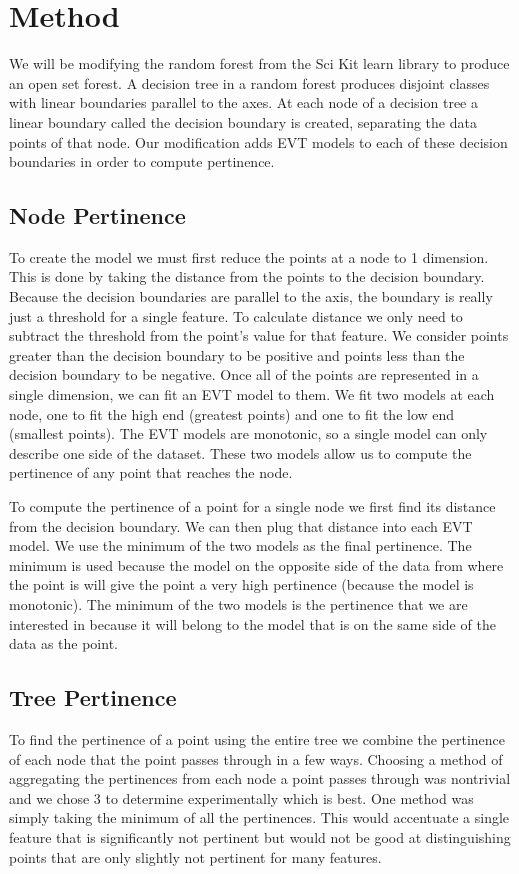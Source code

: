 \documentclass[conference]{IEEEtran}
\begin{document}
\section{Method}
	
We will be modifying the random forest from the Sci Kit learn library \cite{sklearn} to produce an open set forest.  A decision tree in a random forest produces disjoint classes with linear boundaries parallel to the axes.  At each node of a decision tree a linear boundary called the decision boundary is created, separating the data points of that node.  Our modification adds EVT models to each of these decision boundaries in order to compute pertinence.  
\subsection{Node Pertinence}
To create the model we must first reduce the points at a node to 1 dimension.  This is done by taking the distance from the points to the decision boundary.  Because the decision boundaries are parallel to the axis, the boundary is really just a threshold for a single feature.  To calculate distance we only need to subtract the threshold from the point's value for that feature.  We consider points greater than the decision boundary to be positive and points less than the decision boundary to be negative.  Once all of the points are represented in a single dimension, we can fit an EVT model to them.  We fit two models at each node, one to fit the high end (greatest points) and one to fit the low end (smallest points).  The EVT models are monotonic, so a single model can only describe one side of the dataset.  These two models allow us to compute the pertinence of any point that reaches the node.  

To compute the pertinence of a point for a single node we first find its distance from the decision boundary.  We can then plug that distance into each EVT model.  We use the minimum of the two models as the final pertinence.  The minimum is used because the model on the opposite side of the data from where the point is will give the point a very high pertinence (because the model is monotonic).  The minimum of the two models is the pertinence that we are interested in because it will belong to the model that is on the same side of the data as the point.
\subsection{Tree Pertinence}
To find the pertinence of a point using the entire tree we combine the pertinence of each node that the point passes through in a few ways.  Choosing a method of aggregating the pertinences from each node a point passes through was nontrivial and we chose 3 to determine experimentally which is best.  One method was simply taking the minimum of all the pertinences.  This would accentuate a single feature that is significantly not pertinent but would not be good at distinguishing points that are only slightly not pertinent for many features. 
\end{document}
